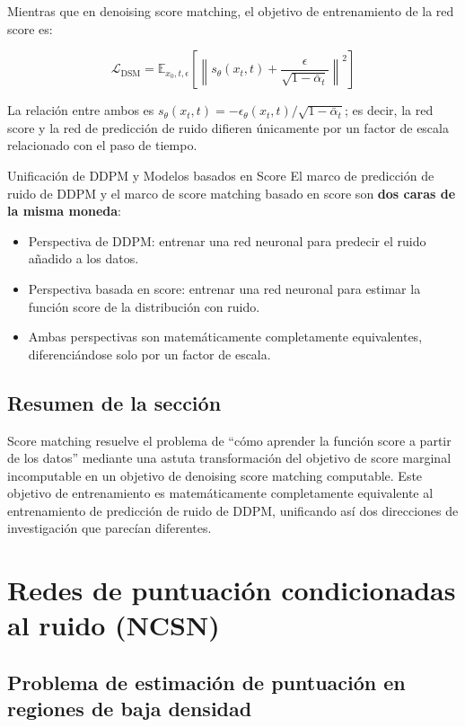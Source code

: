 \documentclass[a4paper]{article}
\begin{document}
Mientras que en denoising score matching, el objetivo de entrenamiento de la red score es:

$$\mathcal{L}_{\text{DSM}} = \mathbb{E}_{x_0, t, \epsilon}\left[\left\| s_\theta(x_t, t) + \frac{\epsilon}{\sqrt{1-\bar{\alpha}_t}} \right\|^2\right]$$

La relación entre ambos es $s_\theta(x_t, t) = -\epsilon_\theta(x_t, t) / \sqrt{1-\bar{\alpha}_t}$; es decir, la red score y la red de predicción de ruido difieren únicamente por un factor de escala relacionado con el paso de tiempo.

\begin{importantbox}{Unificación de DDPM y Modelos basados en Score}
El marco de predicción de ruido de DDPM y el marco de score matching basado en score son \textbf{dos caras de la misma moneda}:
\begin{itemize}
    \item Perspectiva de DDPM: entrenar una red neuronal para predecir el ruido añadido a los datos.
    \item Perspectiva basada en score: entrenar una red neuronal para estimar la función score de la distribución con ruido.
    \item Ambas perspectivas son matemáticamente completamente equivalentes, diferenciándose solo por un factor de escala.
\end{itemize}
\end{importantbox}

\subsection{Resumen de la sección}

Score matching resuelve el problema de ``cómo aprender la función score a partir de los datos'' mediante una astuta transformación del objetivo de score marginal incomputable en un objetivo de denoising score matching computable. Este objetivo de entrenamiento es matemáticamente completamente equivalente al entrenamiento de predicción de ruido de DDPM, unificando así dos direcciones de investigación que parecían diferentes.
\section{Redes de puntuación condicionadas al ruido (NCSN)}

\subsection{Problema de estimación de puntuación en regiones de baja densidad}
\end{document}
